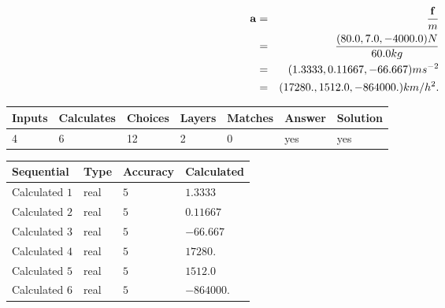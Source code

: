 \documentclass[12pt]{article}
\begin{document}
\begin{eqnarray*}
\mathbf{a}&=&\frac{\mathbf{f}}m  \\
&=&\frac{(
80.0 ,
7.0 ,
-4000.0 )N
}{ %
60.0 kg}  \\
&=&(
1.3333 ,
0.11667,
-66.667
)ms^{-2} \\
&=&(
17280. ,
1512.0 ,
-864000.
)km/h^2.
\end{eqnarray*}
 
 
 
\noindent{}
 
 

 
 
\vspace{0.3in}
   
   
   
   
\noindent\begin{tabular}{|l|l|l|l|l|l|l|}
 \hline
Inputs & Calculates & Choices & Layers & Matches & Answer & Solution \\ \hline
           4  & 
           6  & 
          12
  & 
           2  & 
           0  & 
  yes & 
  yes 
  \\ \hline
 \end{tabular}
   
   
   
   
\noindent{}
   
   
  
  
\noindent\begin{tabular}{|l|l|l|l|}
\hline
 Sequential & Type & Accuracy & Calculated \\ 
\hline
 
 
  Calculated $            1 $ & real & $            5  $ & 
 $ 1.3333 $ 
 \\  \hline  
 
 
  Calculated $            2 $ & real & $            5  $ & 
 $ 0.11667 $ 
 \\  \hline  
 
 
  Calculated $            3 $ & real & $            5  $ & 
 $ -66.667 $ 
 \\  \hline  
 
 
  Calculated $            4 $ & real & $            5  $ & 
 $ 17280. $ 
 \\  \hline  
 
 
  Calculated $            5 $ & real & $            5  $ & 
 $ 1512.0 $ 
 \\  \hline  
 
 
  Calculated $            6 $ & real & $            5  $ & 
 $ -864000. $ 
 \\  \hline  
 \end{tabular}
   
\end{document}
